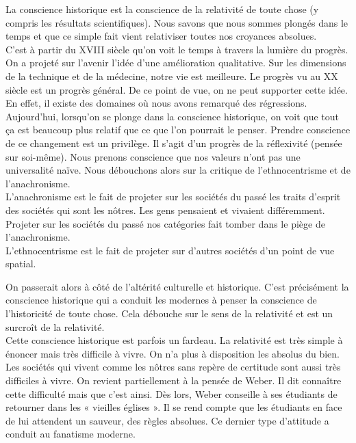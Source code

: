 \documentclass[a4paper,11pt]{article}
\begin{document}
	La conscience historique est la conscience de la relativité de toute chose (y compris les résultats scientifiques). Nous savons que nous sommes plongés dans le temps et que ce simple fait vient relativiser toutes nos croyances absolues.\\
	
	C’est à partir du XVIII siècle qu’on voit le temps à travers la lumière du progrès. On a projeté sur l’avenir l’idée d’une amélioration qualitative. Sur les dimensions de la technique et de la médecine, notre vie est meilleure. Le progrès vu au XX siècle est un progrès général. De ce point de vue, on ne peut supporter cette idée. En effet, il existe des domaines où nous avons remarqué des régressions. Aujourd’hui, lorsqu’on se plonge dans la conscience historique, on voit que tout ça est beaucoup plus relatif que ce que l’on pourrait le penser. Prendre conscience de ce changement est un privilège. Il s’agit d’un progrès de la réflexivité (pensée sur soi-même). Nous prenons conscience que nos valeurs n’ont pas une universalité naïve. Nous débouchons alors sur la critique de l’ethnocentrisme et de l’anachronisme.\\
	
	L’anachronisme est le fait de projeter sur les sociétés du passé les traits d’esprit des sociétés qui sont les nôtres.  Les gens pensaient et vivaient différemment. Projeter sur les sociétés du passé nos catégories fait tomber dans le piège de l’anachronisme.\\
	
	L’ethnocentrisme est le fait de projeter sur d’autres sociétés d’un point de vue spatial.
	
	On passerait alors à côté de l’altérité culturelle et historique. C’est précisément la conscience historique qui a conduit les modernes à penser la conscience de l’historicité de toute chose. Cela débouche sur le sens de la relativité et est un surcroît de la relativité.\\

	
	Cette conscience historique est parfois un fardeau.
	La relativité est très simple à énoncer mais très difficile à vivre. On n’a plus à disposition les absolus du bien.
	Les sociétés qui vivent comme les nôtres sans repère de certitude sont aussi très difficiles à vivre.
	On revient partiellement à la pensée de Weber.
	Il dit connaître cette difficulté mais que c’est ainsi.
	Dès lors, Weber conseille à ses étudiants de retourner dans les « vieilles églises ».
	Il se rend compte que les étudiants en face de lui attendent un sauveur, des règles absolues. Ce dernier type d’attitude a conduit au fanatisme moderne.\\
	
\end{document}
